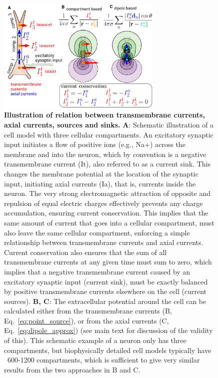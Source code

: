 \documentclass[preprint,10pt,authoryear]{elsarticle}
\newcommand{\newtxt}[1]{{\color{Red}#1}}
\begin{document}
\begin{figure}[H]
	\centering
	\includegraphics[width=0.7\textwidth]{illustration_imem_iaxial.pdf}
	\caption{\textbf{\newtxt{Illustration of relation between transmembrane currents, axial currents, sources and sinks}.} 
	\newtxt{
 {\bf A}: Schematic illustration of a cell model with three cellular compartments. An excitatory synaptic input initiates a flow of positive ions (e.g., Na+) across the membrane and into the neuron, which by convention is a negative transmembrane current (It), also referred to as a current sink. This changes the membrane potential at the location of the synaptic input, initiating axial currents (Ia), that is, currents inside the neuron. The very strong electromagnetic attraction of opposite and repulsion of equal electric charges effectively prevents any charge accumulation, ensuring current conservation. This implies that the same amount of current that goes into a cellular compartment, must also leave the same cellular compartment, enforcing a simple relationship between transmembrane currents and axial currents. Current conservation also ensures that the sum of all transmembrane currents at any given time must sum to zero, which implies that a negative transmembrane current caused by an excitatory synaptic input (current sink), must be exactly balanced by positive transmembrane currents elsewhere on the cell (current sources). {\bf B, C}: The extracellular potential around the cell can be calculated either from the transmembrane currents (B, Eq.~\ref{eq:point_source}), or from the axial currents (C, Eq.~\ref{eq:dipole_approx}) (see main text for discussion of the validity of this). This schematic example of a neuron only has three compartments, but biophysically detailed cell models typically have ~600-1200 compartments, which is sufficient to give very similar results from the two approaches in B and C. 
}}
\label{fig:illustration}
\end{figure}
\end{document}
